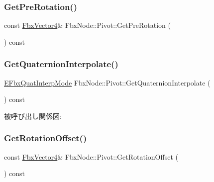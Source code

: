 \mbox{\label{class_fbx_node_1_1_pivot_aeb33eb1d8182c36b1477016e0a1aad5a}} 
\subsubsection{\texorpdfstring{Get\+Pre\+Rotation()}{GetPreRotation()}}
{\footnotesize\ttfamily const \hyperlink{class_fbx_vector4}{Fbx\+Vector4}\& Fbx\+Node\+::\+Pivot\+::\+Get\+Pre\+Rotation (\begin{DoxyParamCaption}{ }\end{DoxyParamCaption}) const}

\mbox{\label{class_fbx_node_1_1_pivot_a2ff9c11d0b9b8c270eb9ba1f39dcc4b3}} 
\subsubsection{\texorpdfstring{Get\+Quaternion\+Interpolate()}{GetQuaternionInterpolate()}}
{\footnotesize\ttfamily \hyperlink{fbxmath_8h_a9c7a0dfb52c83256d4a92c5c6d1be72a}{E\+Fbx\+Quat\+Interp\+Mode} Fbx\+Node\+::\+Pivot\+::\+Get\+Quaternion\+Interpolate (\begin{DoxyParamCaption}{ }\end{DoxyParamCaption}) const}

被呼び出し関係図\+:
\mbox{\label{class_fbx_node_1_1_pivot_ac2d8f3d1768f9e52e7ae096c15d2dcb6}} 
\subsubsection{\texorpdfstring{Get\+Rotation\+Offset()}{GetRotationOffset()}}
{\footnotesize\ttfamily const \hyperlink{class_fbx_vector4}{Fbx\+Vector4}\& Fbx\+Node\+::\+Pivot\+::\+Get\+Rotation\+Offset (\begin{DoxyParamCaption}{ }\end{DoxyParamCaption}) const}

